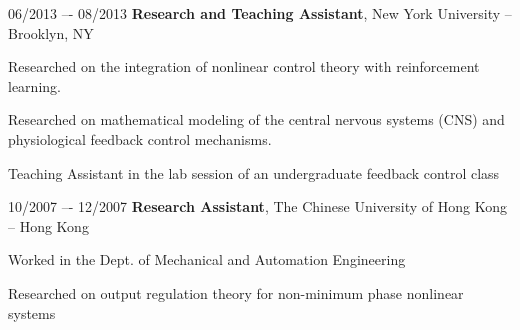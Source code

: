\begin{twocolentry}{06/2013 –- 08/2013}
\textbf{Research and Teaching Assistant}, New York University -- Brooklyn, NY\end{twocolentry}
\vspace{0.10 cm}
\begin{onecolentry}
\begin{highlights}

\item Researched on the integration of nonlinear control theory with reinforcement learning.

\item Researched on mathematical modeling of the central nervous systems (CNS) and physiological feedback control mechanisms.

\item Teaching Assistant in the lab session of an undergraduate feedback control class
\end{highlights}
\end{onecolentry}
\vspace{0.25 cm}


\begin{twocolentry}{10/2007 –- 12/2007}
    \textbf{Research Assistant}, The Chinese University of Hong Kong -- Hong Kong\end{twocolentry}
\vspace{0.10 cm}
\begin{onecolentry}
    \begin{highlights}
    \item Worked in the Dept. of Mechanical and Automation Engineering
    \item Researched on output regulation theory for non-minimum phase nonlinear systems
    \end{highlights}
\end{onecolentry}
\vspace{0.25 cm}